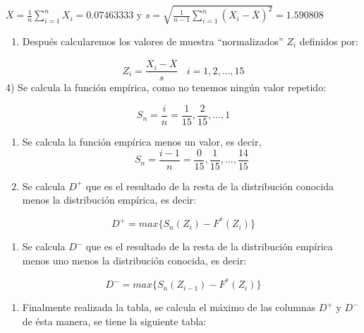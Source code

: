 \documentclass[a4paper,oneside,openany]{book}
\providecommand{\tightlist}{%
  \setlength{\itemsep}{0pt}\setlength{\parskip}{0pt}}
\begin{document}
\(\overline{X}=\frac{1}{n}\sum_{i=1}^{n}X_{i}= 0.07463333\) y
\(s=\sqrt{\frac{1}{n-1}\sum_{i=1}^{n}(X_{i}-\overline{X})^2}=1.590808\)

\begin{enumerate}
\def\labelenumi{\arabic{enumi})}
\setcounter{enumi}{2}
\tightlist
\item
  Después calcularemos los valores de muestra ``normalizados'' \(Z_{i}\)
  definidos por:
\end{enumerate}

\[Z_{i}=\frac{X_{i}-\overline{X}}{s} \ \ \ \ i=1,2,\ldots,15\] 4) Se
calcula la función empírica, como no tenemos ningún valor repetido:

\[S_{n}= \frac{i}{n}=\frac{1}{15},\frac{2}{15}, \ldots, 1 \]

\begin{enumerate}
\def\labelenumi{\arabic{enumi})}
\setcounter{enumi}{4}
\item
  Se calcula la función empírica menos un valor, es decir,
  \[S_{n}= \frac{i-1}{n}=\frac{0}{15},\frac{1}{15}, \ldots, \frac{14}{15}\]
\item
  Se calcula \(D^+\) que es el resultado de la resta de la distribución
  conocida menos la distribución empírica, es decir:
\end{enumerate}

\[D^+= max \{ S_{n}(Z_{i})-F^*(Z_{i})\}\]

\begin{enumerate}
\def\labelenumi{\arabic{enumi})}
\setcounter{enumi}{6}
\tightlist
\item
  Se calcula \(D^-\) que es el resultado de la resta de la distribución
  empírica menos uno menos la distribución conocida, es decir:
\end{enumerate}

\[D^-= max \{ S_{n}(Z_{i-1})-F^*(Z_{i})\}\]

\begin{enumerate}
\def\labelenumi{\arabic{enumi})}
\setcounter{enumi}{7}
\tightlist
\item
  Finalmente realizada la tabla, se calcula el máximo de las columnas
  \(D^+\) y \(D^-\) de ésta manera, se tiene la siguiente tabla:
\end{enumerate}
\end{document}
